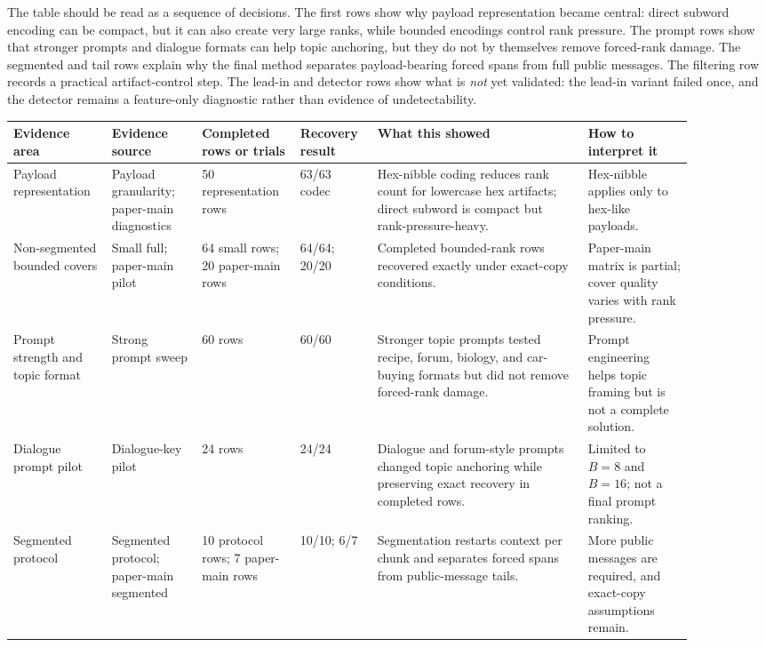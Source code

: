 \documentclass[fleqn,10pt]{wlscirep}
\begin{document}
The table should be read as a sequence of decisions. The first rows show why payload representation became central: direct subword encoding can be compact, but it can also create very large ranks, while bounded encodings control rank pressure. The prompt rows show that stronger prompts and dialogue formats can help topic anchoring, but they do not by themselves remove forced-rank damage. The segmented and tail rows explain why the final method separates payload-bearing forced spans from full public messages. The filtering row records a practical artifact-control step. The lead-in and detector rows show what is \emph{not} yet validated: the lead-in variant failed once, and the detector remains a feature-only diagnostic rather than evidence of undetectability.

\begin{table}[H]
\centering
\scriptsize
\setlength{\tabcolsep}{2pt}
\begin{tabular}{L{0.12\linewidth} L{0.12\linewidth} L{0.12\linewidth} L{0.10\linewidth} L{0.29\linewidth} L{0.14\linewidth}}
\toprule
Evidence area & Evidence source & Completed rows or trials & Recovery result & What this showed & How to interpret it \\
\midrule
Payload representation & Payload granularity; paper-main diagnostics & 50 representation rows & 63/63 codec & Hex-nibble coding reduces rank count for lowercase hex artifacts; direct subword is compact but rank-pressure-heavy. & Hex-nibble applies only to hex-like payloads. \\
Non-segmented bounded covers & Small full; paper-main pilot & 64 small rows; 20 paper-main rows & 64/64; 20/20 & Completed bounded-rank rows recovered exactly under exact-copy conditions. & Paper-main matrix is partial; cover quality varies with rank pressure. \\
Prompt strength and topic format & Strong prompt sweep & 60 rows & 60/60 & Stronger topic prompts tested recipe, forum, biology, and car-buying formats but did not remove forced-rank damage. & Prompt engineering helps topic framing but is not a complete solution. \\
Dialogue prompt pilot & Dialogue-key pilot & 24 rows & 24/24 & Dialogue and forum-style prompts changed topic anchoring while preserving exact recovery in completed rows. & Limited to \(B=8\) and \(B=16\); not a final prompt ranking. \\
Segmented protocol & Segmented protocol; paper-main segmented & 10 protocol rows; 7 paper-main rows & 10/10; 6/7 & Segmentation restarts context per chunk and separates forced spans from public-message tails. & More public messages are required, and exact-copy assumptions remain. \\

\end{tabular}
\end{table}
\end{document}
